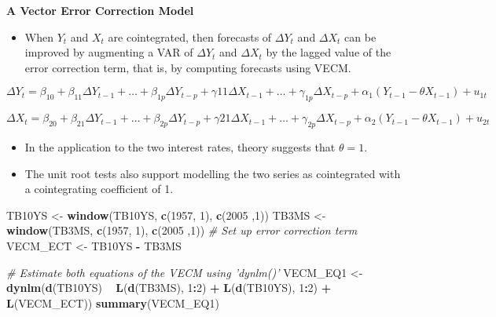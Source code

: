 \documentclass[]{book}
\newenvironment{Shaded}{\begin{snugshade}}{\end{snugshade}}
\newcommand{\CommentTok}[1]{\textcolor[rgb]{0.56,0.35,0.01}{\textit{#1}}}
\newcommand{\DecValTok}[1]{\textcolor[rgb]{0.00,0.00,0.81}{#1}}
\newcommand{\KeywordTok}[1]{\textcolor[rgb]{0.13,0.29,0.53}{\textbf{#1}}}
\newcommand{\NormalTok}[1]{#1}
\newcommand{\OperatorTok}[1]{\textcolor[rgb]{0.81,0.36,0.00}{\textbf{#1}}}
\newcommand{\StringTok}[1]{\textcolor[rgb]{0.31,0.60,0.02}{#1}}
\providecommand{\tightlist}{%
  \setlength{\itemsep}{0pt}\setlength{\parskip}{0pt}}
\begin{document}
\textbf{A Vector Error Correction Model}

\begin{itemize}
\tightlist
\item
  When \(Y_t\) and \(X_t\) are cointegrated, then forecasts of \(\Delta Y_t\) and \(\Delta X_t\) can be improved by augmenting a VAR of \(\Delta Y_t\) and \(\Delta X_t\) by the lagged value of the error correction term, that is, by computing forecasts using VECM.
\end{itemize}

\[\Delta Y_t = \beta_{10} +\beta_{11}\Delta Y_{t-1}+\dots+\beta_{1p}\Delta Y_{t-p}+\gamma{11}\Delta X_{t-1}+\dots+\gamma_{1p}\Delta X_{t-p}+\alpha_1(Y_{t-1}-\theta X_{t-1}) + u_{1t}\]

\[\Delta X_t = \beta_{20} +\beta_{21}\Delta Y_{t-1}+\dots+\beta_{2p}\Delta Y_{t-p}+\gamma{21}\Delta X_{t-1}+\dots+\gamma_{2p}\Delta X_{t-p}+\alpha_2(Y_{t-1}-\theta X_{t-1}) + u_{2t}\]

\begin{itemize}
\tightlist
\item
  In the application to the two interest rates, theory suggests that \(\theta =1\).
\item
  The unit root tests also support modelling the two series as cointegrated with a cointegrating coefficient of 1.
\end{itemize}

\begin{Shaded}
\begin{Highlighting}[]
\NormalTok{TB10YS <-}\StringTok{ }\KeywordTok{window}\NormalTok{(TB10YS, }\KeywordTok{c}\NormalTok{(}\DecValTok{1957}\NormalTok{, }\DecValTok{1}\NormalTok{), }\KeywordTok{c}\NormalTok{(}\DecValTok{2005}\NormalTok{ ,}\DecValTok{1}\NormalTok{))}
\NormalTok{TB3MS <-}\StringTok{ }\KeywordTok{window}\NormalTok{(TB3MS, }\KeywordTok{c}\NormalTok{(}\DecValTok{1957}\NormalTok{, }\DecValTok{1}\NormalTok{), }\KeywordTok{c}\NormalTok{(}\DecValTok{2005}\NormalTok{ ,}\DecValTok{1}\NormalTok{))}
\CommentTok{# Set up error correction term}
\NormalTok{VECM_ECT <-}\StringTok{ }\NormalTok{TB10YS }\OperatorTok{-}\StringTok{ }\NormalTok{TB3MS}

\CommentTok{# Estimate both equations of the VECM using 'dynlm()'}
\NormalTok{VECM_EQ1 <-}\StringTok{ }\KeywordTok{dynlm}\NormalTok{(}\KeywordTok{d}\NormalTok{(TB10YS) }\OperatorTok{~}\StringTok{ }\KeywordTok{L}\NormalTok{(}\KeywordTok{d}\NormalTok{(TB3MS), }\DecValTok{1}\OperatorTok{:}\DecValTok{2}\NormalTok{) }\OperatorTok{+}\StringTok{ }\KeywordTok{L}\NormalTok{(}\KeywordTok{d}\NormalTok{(TB10YS), }\DecValTok{1}\OperatorTok{:}\DecValTok{2}\NormalTok{) }\OperatorTok{+}\StringTok{ }\KeywordTok{L}\NormalTok{(VECM_ECT))}
\KeywordTok{summary}\NormalTok{(VECM_EQ1)}
\end{Highlighting}
\end{Shaded}
\end{document}
